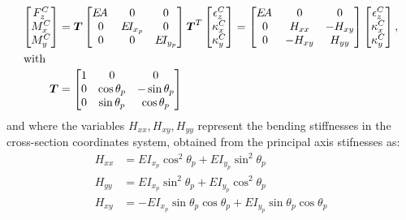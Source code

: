 \documentclass[11pt]{article}
\newcommand{\m}[1]{\boldsymbol{#1}}
\newcommand{\cent}{{C}}
\newcommand{\EA}{{E\!A}\,}
\newcommand{\EI}{E\!I}
\begin{document}
\begin{align}
    \begin{bmatrix}F_z^\cent \\ M_{x}^\cent \\ M_{y}^\cent\\ \end{bmatrix}
    &=
        \m{T}
    \begin{bmatrix}\EA & 0 & 0\\0 & \EI_{x_p} & 0\\0 & 0& \EI_{y_p}\end{bmatrix}
        \m{T}^T
    \begin{bmatrix}\epsilon_z^\cent \\ \kappa_x^\cent \\ \kappa_y^\cent\\ \end{bmatrix}
        =
    \begin{bmatrix}\EA & 0 & 0\\0 & H_{xx} & - H_{xy}\\0 & - H_{xy} & H_{yy}\end{bmatrix}
    \begin{bmatrix}\epsilon_z^\cent \\ \kappa_x^\cent \\ \kappa_y^\cent\\ \end{bmatrix}
            ,
    \label{eq:AxialBendingAtCentroid}
        \\
\shortintertext{with}
    \m{T}&=\begin{bmatrix}1 & 0 & 0\\0 & \cos\theta_p & -\sin\theta_p\\0 & \sin\theta_p& \cos\theta_p\end{bmatrix}
\end{align}
and where the variables $H_{xx},H_{xy},H_{yy}$ represent the bending stiffnesses in the cross-section coordinates system, obtained from the principal axis stifnesses as:
\begin{align}
H_{xx} &=  \EI_{x_p} \cos^{2}\theta_p + \EI_{y_p} \sin^{2}\theta_p \\
H_{yy} &= \EI_{x_p} \sin^{2}\theta_p + \EI_{y_p} \cos^{2}{\theta_p}  \\
H_{xy} &= -\EI_{x_p} \sin\theta_p \cos\theta_p + \EI_{y_p} \sin\theta_p \cos\theta_p
\end{align}
% 
% 
\end{document}
